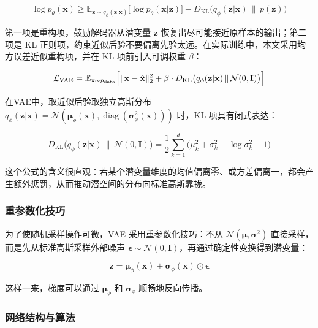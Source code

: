 \documentclass[UTF8,a4paper,12pt]{ctexart}
\newcommand{\Ncal}{\mathcal{N}}
\newcommand{\E}{\mathbb{E}}
\newcommand{\KL}{D_{\mathrm{KL}}}
\begin{document}
\begin{equation}
    \log p_{\theta}(\mathbf{x}) \ge \E_{\mathbf{z}\sim q_{\phi}(\mathbf{z}|\mathbf{x})}\bigl[\log p_{\theta}(\mathbf{x}|\mathbf{z})\bigr] - \KL\bigl(q_{\phi}(\mathbf{z}|\mathbf{x})\,\|\,p(\mathbf{z})\bigr)
\end{equation}

第一项是重构项，鼓励解码器从潜变量 $\mathbf{z}$ 恢复出尽可能接近原样本的输出；第二项是 KL 正则项，约束近似后验不要偏离先验太远。在实际训练中，本文采用均方误差近似重构项，并在 KL 项前引入可调权重 $\beta$：

\begin{equation}
    \mathcal{L}_{\mathrm{VAE}} = \E_{\mathbf{x}\sim p_{\mathrm{data}}}\Bigl[\|\mathbf{x} - \hat{\mathbf{x}}\|_2^2 + \beta\cdot\KL\bigl(q_{\phi}(\mathbf{z}|\mathbf{x})\,\|\,\Ncal(0,\mathbf{I})\bigr)\Bigr]
\end{equation}

在VAE中，取近似后验取独立高斯分布 $q_{\phi}(\mathbf{z}|\mathbf{x}) = \Ncal(\boldsymbol{\mu}_{\phi}(\mathbf{x}), \operatorname{diag}(\boldsymbol{\sigma}_{\phi}^2(\mathbf{x})))$ 时，KL 项具有闭式表达：

\begin{equation}
    \KL\bigl(q_{\phi}(\mathbf{z}|\mathbf{x})\,\|\,\Ncal(0,\mathbf{I})\bigr) = \frac{1}{2}\sum_{k=1}^{d}\bigl(\mu_k^2 + \sigma_k^2 - \log\sigma_k^2 - 1\bigr)
\end{equation}

这个公式的含义很直观：若某个潜变量维度的均值偏离零、或方差偏离一，都会产生额外惩罚，从而推动潜空间的分布向标准高斯靠拢。

\subsubsection{重参数化技巧}

为了使随机采样操作可微，VAE 采用重参数化技巧：不从 $\Ncal(\boldsymbol{\mu},\boldsymbol{\sigma}^2)$ 直接采样，而是先从标准高斯采样外部噪声 $\boldsymbol{\epsilon}\sim\Ncal(0,\mathbf{I})$，再通过确定性变换得到潜变量：

\begin{equation}
    \mathbf{z} = \boldsymbol{\mu}_{\phi}(\mathbf{x}) + \boldsymbol{\sigma}_{\phi}(\mathbf{x}) \odot \boldsymbol{\epsilon}
\end{equation}

这样一来，梯度可以通过 $\boldsymbol{\mu}_{\phi}$ 和 $\boldsymbol{\sigma}_{\phi}$ 顺畅地反向传播。

\subsubsection{网络结构与算法}
\end{document}
